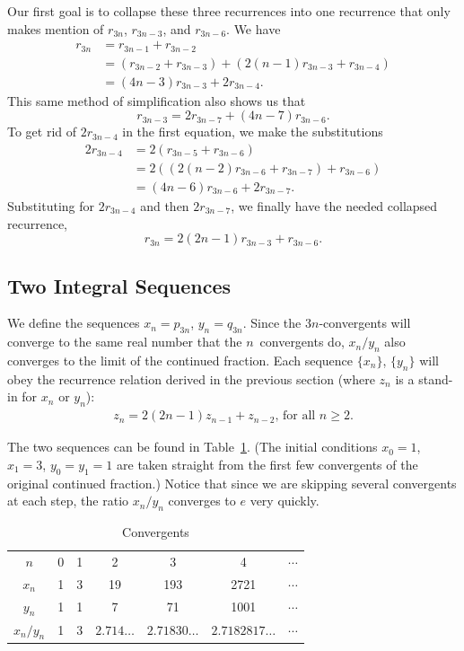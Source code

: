 Our first goal is to collapse these three recurrences into one
recurrence that only makes mention of $r_{3n}$, $r_{3n-3}$, and
$r_{3n-6}$. We have
\begin{align*}
r_{3n}&=r_{3n-1}+r_{3n-2}\\
&=(r_{3n-2}+r_{3n-3})+(2(n-1)r_{3n-3}+r_{3n-4})\\
&=(4n-3)r_{3n-3}+2r_{3n-4}.
\end{align*}
This same method of simplification also shows us that
$$
  r_{3n-3}=2r_{3n-7}+(4n-7)r_{3n-6}.
$$
To get rid of $2r_{3n-4}$ in the first equation, we make the
substitutions
\begin{align*}
2r_{3n-4}&=2(r_{3n-5}+r_{3n-6})\\
&=2((2(n-2)r_{3n-6}+r_{3n-7})+r_{3n-6})\\
&=(4n-6)r_{3n-6}+2r_{3n-7}.
\end{align*}
Substituting for $2r_{3n-4}$ and then $2r_{3n-7}$, we finally have the
needed collapsed recurrence,
$$
  r_{3n}=2(2n-1)r_{3n-3}+r_{3n-6}.
$$

\subsection{Two Integral Sequences}
We define the sequences $x_n=p_{3n}$, $y_n=q_{3n}$. Since the
$3n$-convergents will converge to the same real number that the
$n$~convergents do, $x_n/y_n$ also converges to the limit of the
continued fraction. Each sequence $\{x_n\}$, $\{y_n\}$ will obey the
recurrence relation derived in the previous section (where $z_n$ is a
stand-in for $x_n$ or $y_n$):
\begin{align}\label{relation}
   z_n=2(2n-1)z_{n-1}+z_{n-2} \text{, for all }n\geq2.
\end{align}

The two sequences can be found in Table~\ref{tab}. (The initial
conditions $x_0=1$, $x_1=3$, $y_0=y_1=1$ are taken straight from the
first few convergents of the original continued fraction.) Notice that
since we are skipping several convergents at each step, the ratio
$x_n/y_n$ converges to $e$ very quickly.
\begin{table}
\caption{Convergents\label{tab}}
\begin{center}
\begin{tabular}{|c|c|c|c|c|c|c|}\hline
\cline{2-7}
$n$&0&1&2&3&4&$\cdots$\\
\cline{2-7}
$x_n$&1&3&19&193&2721&$\cdots$\\
\cline{2-7}
$y_n$&1&1&7&71&1001&$\cdots$\\
\hline\hline
$x_n/y_n$&1&3&$2.714\ldots$&$2.71830\ldots$&$2.7182817\ldots$&$\cdots$\\
\cline{2-7}\hline
\end{tabular}
\end{center}
\end{table}


